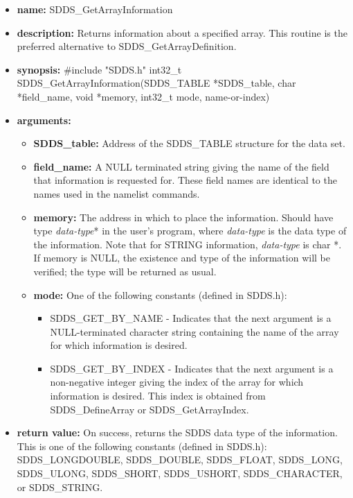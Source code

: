 \documentclass[11pt]{article}
\begin{document}
\begin{itemize}
\item {\bf name:}\newline
SDDS\_GetArrayInformation
\item {\bf description:}\newline
Returns information about a specified array. This routine is the preferred alternative to SDDS\_GetArrayDefinition.
\item {\bf synopsis:} \#include "SDDS.h"\newline
int32\_t SDDS\_GetArrayInformation(SDDS\_TABLE *SDDS\_table, char *field\_name, void *memory, int32\_t mode,  name-or-index)
\item {\bf arguments:}
\begin{itemize}
\item {\bf SDDS\_table:} Address of the SDDS\_TABLE structure for the data set.
\item {\bf field\_name:} A NULL terminated string giving the name of the field that information is requested for. These field names are identical to the names used in the namelist commands.
\item {\bf memory:} The address in which to place the information. Should have type {\em data-type}* in the user's program, where {\em data-type} is the data type of the information. Note that for STRING information, {\em data-type} is char *. If memory is NULL, the existence and type of the information will be verified; the type will be returned as usual.
\item {\bf mode:} One of the following constants (defined in SDDS.h):
\begin{itemize}
\item SDDS\_GET\_BY\_NAME -  Indicates that the next argument is a NULL-terminated character string containing the name of the array for which information is desired.
\item SDDS\_GET\_BY\_INDEX - Indicates that the next argument is a non-negative integer giving the index of the array for which information is desired. This index is obtained from SDDS\_DefineArray or SDDS\_GetArrayIndex.
\end{itemize}
\end{itemize}
\item {\bf return value:}\newline
On success, returns the SDDS data type of the information. This is one of the following constants (defined in SDDS.h): SDDS\_LONGDOUBLE, SDDS\_DOUBLE, SDDS\_FLOAT, SDDS\_LONG, SDDS\_ULONG, SDDS\_SHORT, SDDS\_USHORT, SDDS\_CHARACTER, or SDDS\_STRING.\newline

\end{itemize}
\end{document}
